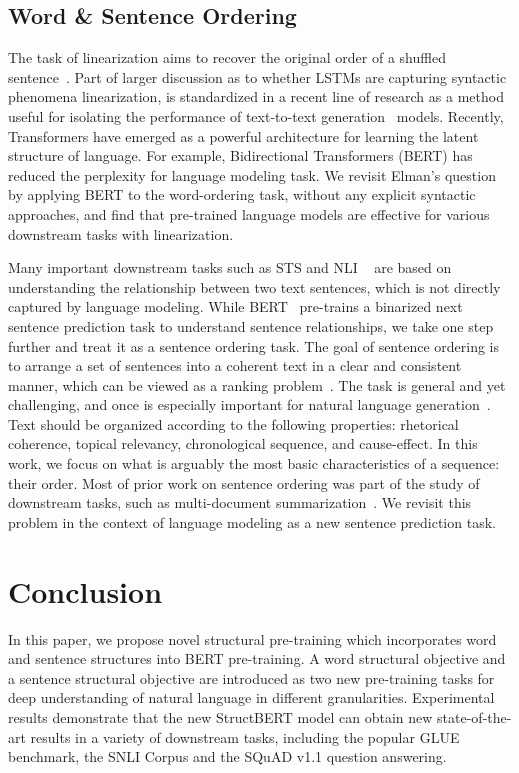 \documentclass{article}
\begin{document}
\subsection{Word \& Sentence Ordering}
The task of linearization aims to recover the original order of a shuffled sentence~\cite{schmaltz2016word}. Part of larger discussion as to whether LSTMs are capturing syntactic phenomena linearization, is standardized in a recent line of research as a method useful for isolating the performance of text-to-text generation~\cite{zhang2015discriminative} models.
Recently, Transformers have emerged as a powerful architecture for learning the latent structure of language. For example, Bidirectional Transformers (BERT) has reduced the perplexity for language modeling task. We revisit Elman's question by applying BERT to the word-ordering task, without any explicit syntactic approaches, and find that pre-trained language models are effective for various downstream tasks with linearization.

Many important downstream tasks such as STS and NLI ~\cite{wang2018glue} are based on understanding the relationship between two text sentences, which is not directly captured by language modeling. While BERT~\cite{devlin2018bert} pre-trains a binarized next sentence prediction task to understand sentence relationships, we take one step further and treat it as a sentence ordering task.
The goal of sentence ordering is to arrange a set of sentences into a coherent text in a clear and consistent manner, which can be viewed as a ranking problem~\cite{chen2016neural}. The task is general and yet challenging, and once is especially important for natural language generation~\cite{reiter1997building}. 
Text should be organized according to the following properties: rhetorical coherence, topical relevancy, chronological sequence, and cause-effect. In this work, we focus on what is arguably the most basic characteristics of a sequence: their order. Most of prior work on sentence ordering was part of the study of downstream tasks, such as multi-document summarization~\cite{bollegala2010bottom}. We revisit this problem in the context of language modeling as a new sentence prediction task.

\section{Conclusion}
In this paper, we propose novel structural pre-training which incorporates word and sentence structures into BERT pre-training. A word structural objective and a sentence structural objective are introduced as two new pre-training tasks for deep understanding of natural language in different granularities. Experimental results demonstrate that the new StructBERT model can obtain new state-of-the-art results in a variety of downstream tasks, including the popular GLUE benchmark, the SNLI Corpus and the SQuAD v1.1 question answering.



\end{document}
